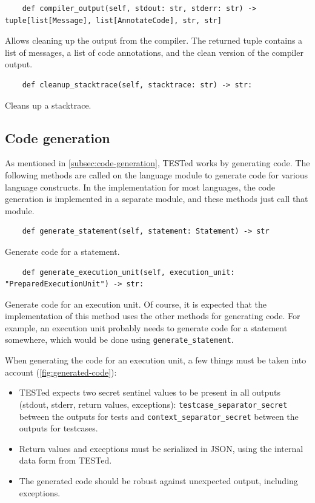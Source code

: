\documentclass[../main]{subfiles}
\begin{document}
\begin{verbatim}
    def compiler_output(self, stdout: str, stderr: str) -> tuple[list[Message], list[AnnotateCode], str, str]
\end{verbatim}

Allows cleaning up the output from the compiler.
The returned tuple contains a list of messages, a list of code annotations, and the clean version of the compiler output.

\begin{verbatim}
    def cleanup_stacktrace(self, stacktrace: str) -> str:
\end{verbatim}

Cleans up a stacktrace.

\subsection{Code generation}\label{subsec:code-generation2}

As mentioned in \cref{subsec:code-generation}, TESTed works by generating code.
The following methods are called on the language module to generate code for various language constructs.
In the implementation for most languages, the code generation is implemented in a separate module, and these methods just call that module.

\begin{verbatim}
    def generate_statement(self, statement: Statement) -> str
\end{verbatim}

Generate code for a statement.

\begin{verbatim}
    def generate_execution_unit(self, execution_unit: "PreparedExecutionUnit") -> str:
\end{verbatim}

Generate code for an execution unit.
Of course, it is expected that the implementation of this method uses the other methods for generating code.
For example, an execution unit probably needs to generate code for a statement somewhere, which would be done using \texttt{generate_statement}.

When generating the code for an execution unit, a few things must be taken into account (\cref{fig:generated-code}):

\begin{itemize}
    \item TESTed expects two secret sentinel values to be present in all outputs (stdout, stderr, return values, exceptions): \texttt{testcase\_separator\_secret} between the outputs for tests and \texttt{context\_separator\_secret} between the outputs for testcases.
    \item Return values and exceptions must be serialized in JSON, using the internal data form from TESTed.
    \item The generated code should be robust against unexpected output, including exceptions.
\end{itemize}
\end{document}
